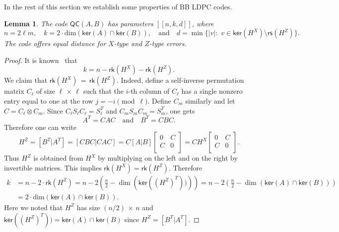 \documentclass{article}
\newcommand{\be}{\begin{equation}}
\newcommand{\ee}{\end{equation}}
\newcommand{\ba}{\begin{array}}
\newcommand{\ea}{\end{array}}
\newcommand{\rs}[1]{\mathsf{rs}{(#1)}}
\renewcommand{\ker}[1]{\mathsf{ker}{(#1)}}
\newcommand{\rk}[1]{\mathsf{rk}{(#1)}}
\newcommand{\qc}{\mathsf{QC}(A,B)}
\newtheorem{lemma}{Lemma}
\begin{document}
In the rest of this section we establish some
properties of BB LDPC codes.
\begin{lemma}
\label{lem:kd}
The code $\qc$ has parameters $[[n,k,d]]$, where
\[
n = 2\ell m,\quad 
k = 2\cdot\mathrm{dim}\left(\ker{A} \cap \ker{B}\right),
\quad \mbox{and} \quad
d= \min\bigl\{ |v|{:} \,\, v\in \ker{H^X}{\setminus} \rs{H^Z} \bigr\}.
\]
The code offers equal distance for $X$-type and $Z$-type errors.
\end{lemma}
\begin{proof}
It is known~\cite{steane1996multiple,calderbank1996good} that 
\[
k = n - \rk{H^X}-\rk{H^Z}.
\]
We claim that $\rk{H^X}\,{=}\,\rk{H^Z}$.
Indeed, define a self-inverse permutation matrix $C_\ell$ of size $\ell \,{\times}\, \ell$ such that the $i$-th column of $C_\ell$ has a single nonzero entry equal to one at the row $j=-i{\pmod \ell}$. Define $C_m$ similarly
and let $C=C_\ell \otimes C_m$. Since $C_\ell S_\ell C_\ell = S_\ell^T$
and $C_m S_m C_m = S_m^T$, one gets
\be
\label{ABC2}
A^T = C AC \quad \mbox{and} \quad B^T = CBC.
\ee
Therefore one can write
\[
H^Z= [B^T|A^T] = [CBC |CAC] = C[A|B]\left[ \ba{cc} 0 & C  \\ C & 0\\ \ea \right]
=CH^X\left[ \ba{cc} 0 & C  \\ C & 0\\ \ea \right].
\]
Thus $H^Z$ is obtained from $H^X$ by multiplying on the left and on the right by invertible matrices.
This implies $\rk{H^X}=\rk{H^Z}$. Therefore
\begin{align*}
k& = n-2{\cdot}\rk{H^Z}=n-2{\left(\frac{n}2-\dim{(\ker{(H^Z)^T)})}\right)} = n - 2{\left(\frac{n}2-\dim{(\ker{A}\cap \ker{B})}\right)}\\
&= 2\cdot\mathrm{dim}\left(\ker{A} \cap \ker{B}\right).
\end{align*}
Here we noted that $H^Z$ has size $(n/2)\,{\times}\, n$ and $\ker{(H^Z)^T)}=\ker{A}\cap \ker{B}$ since $H^Z=[B^T|A^T]$.


\end{proof}
\end{document}

